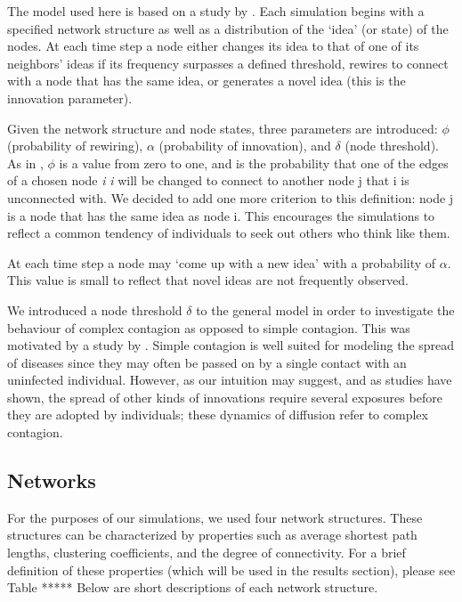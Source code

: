 

The model used here is based on a study by \citet*{HN2006}.  Each simulation begins with a specified network structure as well as a distribution of the `idea' (or state) of the nodes. At each time step a node either changes its idea to that of one of its neighbors' ideas if its frequency surpasses a defined threshold, rewires to connect with a node that has the same idea, or generates a novel idea (this is the innovation parameter). 


Given the network structure and node states, three parameters are introduced: $\phi$ (probability of rewiring), $\alpha$ (probability of innovation), and $\delta$ (node threshold). As in \citet*{HN2006}, $\phi$ is a value from zero to one, and is the probability that one of the edges of a chosen node \emph{i} \textit{i} will be changed to connect to another node j that i is unconnected with. We decided to add one more criterion to this definition: node j is a node that has the same idea as node i. This encourages the simulations to reflect a common tendency of individuals to seek out others who think like them.


At each time step a node may `come up with a new idea' with a probability of $\alpha$. This value is small to reflect that novel ideas are not frequently observed.


We introduced a node threshold $\delta$ to the general model in order to investigate the behaviour of complex contagion as opposed to simple contagion. This was motivated by a study by \citet*{CM2007}. Simple contagion is well suited for modeling the spread of diseases since they may often be passed on by a single contact with an uninfected individual. However, as our intuition may suggest, and as studies have shown, the spread of other kinds of innovations require several exposures before they are adopted by individuals; these dynamics of diffusion refer to complex contagion.


\subsection{Networks}

For the purposes of our simulations, we used four network structures. These structures can be characterized by properties such as average shortest path lengths, clustering coefficients, and the degree of connectivity. For a brief definition of these properties (which will be used in the results section), please see Table ***** Below are short descriptions of each network structure.

